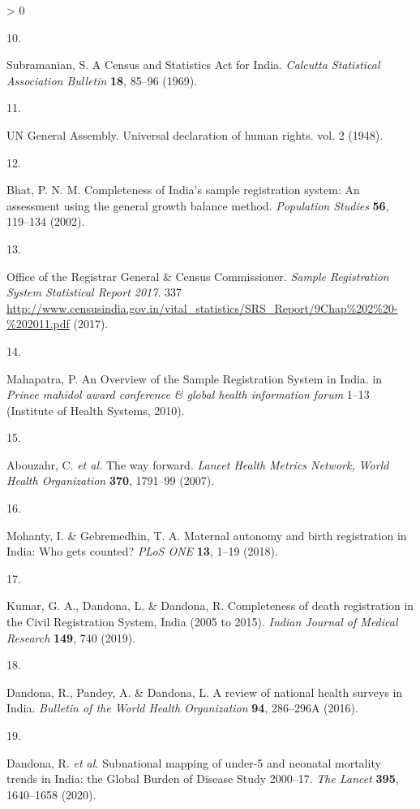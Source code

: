 \documentclass[
]{article}
\newlength{\cslhangindent}
\newlength{\csllabelwidth}
\newenvironment{CSLReferences}[2] %
 {%
  \setlength{\parindent}{0pt}
  \ifodd #1 \everypar{\setlength{\hangindent}{\cslhangindent}}\ignorespaces\fi
  \ifnum #2 > 0
  \setlength{\parskip}{#2\baselineskip}
  \fi
 }%
 {}
\newcommand{\CSLLeftMargin}[1]{\parbox[t]{\csllabelwidth}{#1}}
\newcommand{\CSLRightInline}[1]{\parbox[t]{\linewidth - \csllabelwidth}{#1}\break}
\begin{document}
\begin{CSLReferences}{0}{0}
\leavevmode\hypertarget{ref-Subramanian1969}{}%
\CSLLeftMargin{10. }
\CSLRightInline{Subramanian, S. {A Census and Statistics Act for India}. \emph{Calcutta Statistical Association Bulletin} \textbf{18}, 85--96 (1969).}

\leavevmode\hypertarget{ref-srs}{}%
\CSLLeftMargin{11. }
\CSLRightInline{UN General Assembly. {Universal declaration of human rights}. vol. 2 (1948).}

\leavevmode\hypertarget{ref-Bhat2002}{}%
\CSLLeftMargin{12. }
\CSLRightInline{Bhat, P. N. M. {Completeness of India's sample registration system: An assessment using the general growth balance method}. \emph{Population Studies} \textbf{56}, 119--134 (2002).}

\leavevmode\hypertarget{ref-CensusofIndia2017}{}%
\CSLLeftMargin{13. }
\CSLRightInline{Office of the Registrar General \& Census Commissioner. \emph{{Sample Registration System Statistical Report 2017}}. 337 \url{http://www.censusindia.gov.in/vital_statistics/SRS_Report/9Chap\%202\%20-\%202011.pdf} (2017).}

\leavevmode\hypertarget{ref-Mahapatra2010}{}%
\CSLLeftMargin{14. }
\CSLRightInline{Mahapatra, P. {An Overview of the Sample Registration System in India}. in \emph{Prince mahidol award conference \& global health information forum} 1--13 (Institute of Health Systems, 2010).}

\leavevmode\hypertarget{ref-Abouzahr2007}{}%
\CSLLeftMargin{15. }
\CSLRightInline{Abouzahr, C. \emph{et al.} {The way forward}. \emph{Lancet Health Metrics Network, World Health Organization} \textbf{370}, 1791--99 (2007).}

\leavevmode\hypertarget{ref-Mohanty2018}{}%
\CSLLeftMargin{16. }
\CSLRightInline{Mohanty, I. \& Gebremedhin, T. A. {Maternal autonomy and birth registration in India: Who gets counted?} \emph{PLoS ONE} \textbf{13}, 1--19 (2018).}

\leavevmode\hypertarget{ref-Kumar2019}{}%
\CSLLeftMargin{17. }
\CSLRightInline{Kumar, G. A., Dandona, L. \& Dandona, R. {Completeness of death registration in the Civil Registration System, India (2005 to 2015)}. \emph{Indian Journal of Medical Research} \textbf{149}, 740 (2019).}

\leavevmode\hypertarget{ref-Dandona2016}{}%
\CSLLeftMargin{18. }
\CSLRightInline{Dandona, R., Pandey, A. \& Dandona, L. {A review of national health surveys in India}. \emph{Bulletin of the World Health Organization} \textbf{94}, 286--296A (2016).}

\leavevmode\hypertarget{ref-Dandona2020}{}%
\CSLLeftMargin{19. }
\CSLRightInline{Dandona, R. \emph{et al.} {Subnational mapping of under-5 and neonatal mortality trends in India: the Global Burden of Disease Study 2000--17}. \emph{The Lancet} \textbf{395}, 1640--1658 (2020).}


\end{CSLReferences}
\end{document}
